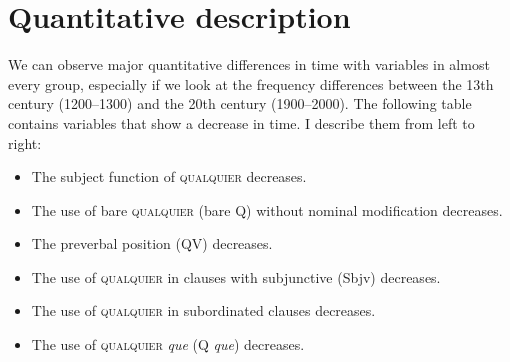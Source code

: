 \section{Quantitative description}

We can observe major quantitative differences in time with variables in almost every group, especially if we look at the frequency differences between the 13th century (1200–1300) and the 20th century (1900–2000). The following table contains variables that show a decrease in time. I describe them from left to right: 

\begin{itemize}
\item The subject function of \textsc{qualquier} decreases.
\item The use of bare \textsc{qualquier} (bare Q) without nominal modification decreases.
\item The preverbal position (QV) decreases. 
\item The use of \textsc{qualquier} in clauses with subjunctive (Sbjv) decreases. 
\item The use of \textsc{qualquier} in subordinated clauses decreases.
\item The use of \textsc{qualquier} \textit{que} (Q \textit{que}) decreases.
\end{itemize}


